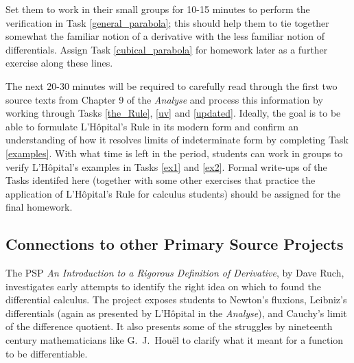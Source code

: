 \message{ !name(LHopitalsRule_2021.03.29.tex)}\documentclass[11pt]{article}
\begin{document}
Set them to work in their small groups for 10-15 minutes to perform the verification in Task \ref{general_parabola}; this should help them to tie together somewhat the familiar notion of a derivative with the less familiar notion of differentials. Assign Task \ref{cubical_parabola} for homework later as a further exercise along these lines.

The next 20-30 minutes will be required to carefully read through the first two source texts from Chapter 9 of the \emph{Analyse} and process this information by working through Tasks \ref{the_Rule}, \ref{uv} and \ref{updated}. Ideally, the goal is to be able to formulate L'H\^opital's Rule in its modern form and confirm an understanding of how it resolves limits of indeterminate form by completing Task \ref{examples}. With what time is left in the period, students can work in groups to verify L'H\^opital's examples in Tasks \ref{ex1} and \ref{ex2}. Formal write-ups of the Tasks identifed here (together with some other exercises that practice the application of L'H\^opital's Rule for calculus students) should be assigned for the final homework.

 \vspace*{-6pt}
\subsection*{Connections to other Primary Source Projects}

 \vspace*{-3pt}
The PSP \emph{An Introduction to a Rigorous Definition of Derivative}, by Dave Ruch, investigates early attempts to identify the right idea on which to found the differential calculus. The project exposes students to Newton's fluxions, Leibniz's differentials (again as presented by L'H\^opital in the \emph{Analyse}), and Cauchy's limit of the difference quotient. It also presents some of the struggles by nineteenth century mathematicians like G.~J.~Hou{\"e}l to clarify what it meant for a function to be differentiable.

\end{document}
